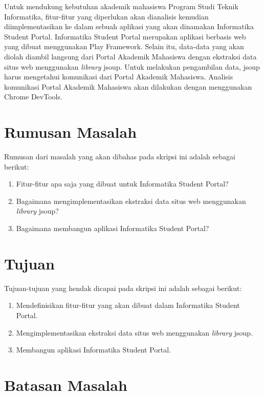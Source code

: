 Untuk mendukung kebutuhan akademik mahasiswa Program Studi Teknik Informatika, fitur-fitur yang diperlukan akan dianalisis kemudian diimplementasikan ke dalam sebuah aplikasi yang akan dinamakan Informatika Student Portal. Informatika Student Portal merupakan aplikasi berbasis web yang dibuat menggunakan Play Framework. Selain itu, data-data yang akan diolah diambil langsung dari Portal Akademik Mahasiswa dengan ekstraksi data situs web menggunakan \textit{library} jsoup. Untuk melakukan pengambilan data, jsoup harus mengetahui komunikasi dari Portal Akademik Mahasiswa. Analisis komunikasi Portal Akademik Mahasiswa akan dilakukan dengan menggunakan Chrome DevTools. 

\section{Rumusan Masalah}
\label{sec:rumusan_masalah}

Rumusan dari masalah yang akan dibahas pada skripsi ini adalah sebagai
berikut:
\begin{enumerate}
	\item Fitur-fitur apa saja yang dibuat untuk Informatika Student Portal?
	\item Bagaimana mengimplementasikan ekstraksi data situs web menggunakan \textit{library} jsoup?
	\item Bagaimana membangun aplikasi Informatika Student Portal?
\end{enumerate}

\section{Tujuan}
\label{sec:tujuan}

Tujuan-tujuan yang hendak dicapai pada skripsi ini adalah sebagai berikut:
\begin{enumerate}
	\item	Mendefinisikan fitur-fitur yang akan dibuat dalam Informatika Student Portal.
	\item	Mengimplementasikan ekstraksi data situs web menggunakan \textit{library} jsoup.
	\item Membangun aplikasi Informatika Student Portal.
\end{enumerate}

\section{Batasan Masalah}
\label{sec:batasan_masalah}

